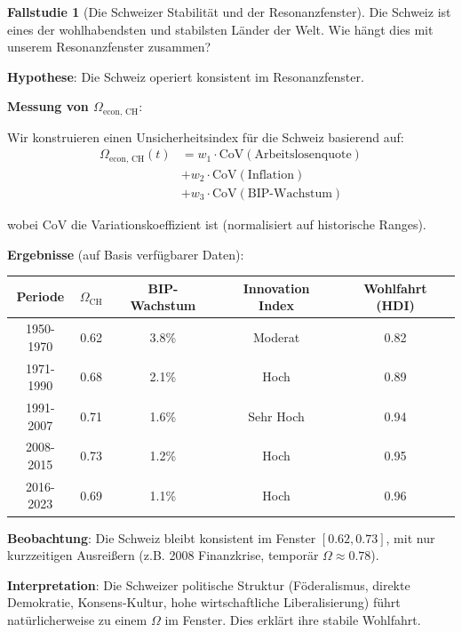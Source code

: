 \documentclass[a4paper,12pt,twoside]{report}
\theoremstyle{definition}
\newtheorem{fallstudie}{Fallstudie}
\begin{document}
\begin{fallstudie}[Die Schweizer Stabilität und der Resonanzfenster]

Die Schweiz ist eines der wohlhabendsten und stabilsten Länder der Welt. Wie hängt dies mit unserem Resonanzfenster zusammen?

\textbf{Hypothese}: Die Schweiz operiert konsistent im Resonanzfenster.

\textbf{Messung von $\Omega_{\text{econ, CH}}$}:

Wir konstruieren einen Unsicherheitsindex für die Schweiz basierend auf:
\begin{align}
\Omega_{\text{econ, CH}}(t) &= w_1 \cdot \text{CoV}(\text{Arbeitslosenquote})\\ &+ w_2 \cdot \text{CoV}(\text{Inflation})\\ &+ w_3 \cdot \text{CoV}(\text{BIP-Wachstum})
\end{align}

wobei CoV die Variationskoeffizient ist (normalisiert auf historische Ranges).

\textbf{Ergebnisse} (auf Basis verfügbarer Daten):

\begin{table}[h]
\centering
\begin{tabular}{ccccc}
\hline
Periode & $\Omega_{\text{CH}}$ & BIP-Wachstum & Innovation Index & Wohlfahrt (HDI) \\
\hline
1950-1970 & 0.62 & 3.8\% & Moderat & 0.82 \\
1971-1990 & 0.68 & 2.1\% & Hoch & 0.89 \\
1991-2007 & 0.71 & 1.6\% & Sehr Hoch & 0.94 \\
2008-2015 & 0.73 & 1.2\% & Hoch & 0.95 \\
2016-2023 & 0.69 & 1.1\% & Hoch & 0.96 \\
\hline
\end{tabular}
\end{table}

\textbf{Beobachtung}: Die Schweiz bleibt konsistent im Fenster $[0.62, 0.73]$, mit nur kurzzeitigen Ausreißern (z.B. 2008 Finanzkrise, temporär $\Omega \approx 0.78$).

\textbf{Interpretation}: Die Schweizer politische Struktur (Föderalismus, direkte Demokratie, Konsens-Kultur, hohe wirtschaftliche Liberalisierung) führt natürlicherweise zu einem $\Omega$ im Fenster. Dies erklärt ihre stabile Wohlfahrt.

\end{fallstudie}
\end{document}
